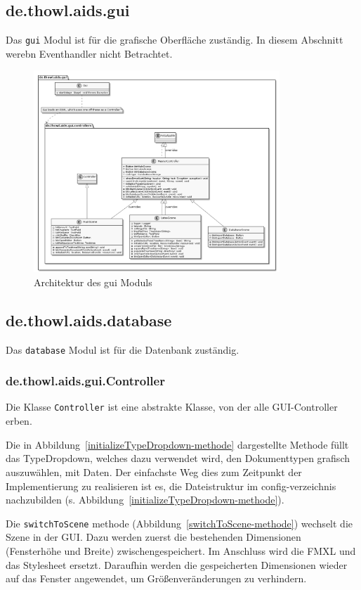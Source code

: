 \documentclass[stu, a4paper, 11pt, floatsintext]{apa7}
\begin{document}
\subsection{de.thowl.aids.gui}
\noindent Das \texttt{gui} Modul ist für die grafische Oberfläche zuständig.
In diesem Abschnitt werebn Eventhandler nicht Betrachtet.

\begin{figure}[!htbp]
\centering
\includegraphics[width=350px]{../technical_documentation/diagramm/uml/flowcharts/gui/gui.png}
\caption{\label{gui Architektur}Architektur des gui Moduls}
\end{figure}

\subsection{de.thowl.aids.database}
\noindent Das \texttt{database} Modul ist für die Datenbank zuständig.

\subsubsection{de.thowl.aids.gui.Controller}
\noindent Die Klasse \texttt{Controller} ist eine abstrakte Klasse, von der alle GUI-Controller erben.

Die in Abbildung~\ref{initializeTypeDropdown-methode} dargestellte Methode füllt das TypeDropdown, welches dazu verwendet wird, den Dokumenttypen grafisch auszuwählen, mit Daten.
Der einfachste Weg dies zum Zeitpunkt der Implementierung zu realisieren ist es, die Dateistruktur im config-verzeichnis nachzubilden (s. Abbildung~\ref{initializeTypeDropdown-methode}).

Die \texttt{switchToScene} methode (Abbildung~\ref{switchToScene-methode}) wechselt die Szene in der GUI.
Dazu werden zuerst die bestehenden Dimensionen (Fensterhöhe und Breite) zwischengespeichert.
Im Anschluss wird die FMXL und das Stylesheet ersetzt. Daraufhin werden die gespeicherten Dimensionen wieder auf das Fenster angewendet, um Größenveränderungen zu verhindern.
\end{document}
